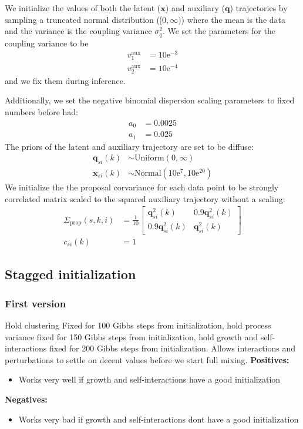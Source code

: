 \documentclass{article}
\newcommand{\var}{\sigma^2}
\newcommand{\Normaldist}{\text{Normal}}
\newcommand{\Uniformdist}{\text{Uniform}}
\newcommand{\x}[2]{\mathbf{x}_{#2}(#1)}
\newcommand{\q}[2]{\mathbf{q}_{#2}(#1)}
\newcommand{\qexp}[3]{\mathbf{q}^{#3}_{#2}(#1)}
\newcommand{\varcoupling}{\var_q}
\begin{document}
We initialize the values of both the latent ($\mathbf{x}$) and auxiliary ($\mathbf{q}$) trajectories by sampling a truncated normal distribution ($[0,\infty)$) where the mean is the data and the variance is the coupling variance $\varcoupling$. We set the parameters for the coupling variance to be
\begin{align}
  v_1^{\text{aux}} & = 10\text{e}^{-3} \\
  v_2^{\text{aux}} & = 10\text{e}^{-4}
\end{align}
and we fix them during inference.

Additionally, we set the negative binomial dispersion scaling parameters to fixed numbers before had:
\begin{align}
  a_0 & = 0.0025 \\
  a_1 & = 0.025
\end{align}
The priors of the latent and auxiliary trajectory are set to be diffuse:
\begin{align}
  \q{k}{si} & \sim \Uniformdist(0,\infty) \\
  \x{k}{si} & \sim \Normaldist(10\text{e}^7, 10\text{e}^{20})
\end{align}
We initialize the the proposal corvariance for each data point to be strongly correlated matrix scaled to the squared auxiliary trajectory without a scaling:
\begin{align}
  \Sigma_{\text{prop}}(s,k,i) & = \frac{1}{10} \left[
    \begin{array}{ccc}
    \qexp{k}{si}{2} & 0.9 \qexp{k}{si}{2} \\
    0.9 \qexp{k}{si}{2} & \qexp{k}{si}{2}
    \end{array} \right] \\
  c_{si}(k) & = 1
\end{align}

\subsection{Stagged initialization}
\subsubsection{First version}
Hold clustering Fixed for 100 Gibbs steps from initialization, hold process variance fixed for 150 Gibbs steps from initialization, hold growth and self-interactions fixed for 200 Gibbs steps from initialization. Allows interactions and perturbations to settle on decent values before we start full mixing. \newline
\textbf{Positives:}
\begin{itemize}
  \item Works very well if growth and self-interactions have a good initialization
\end{itemize}
\textbf{Negatives:}
\begin{itemize}
  \item Works very bad if growth and self-interactions dont have a good initialization
\end{itemize}
\end{document}
